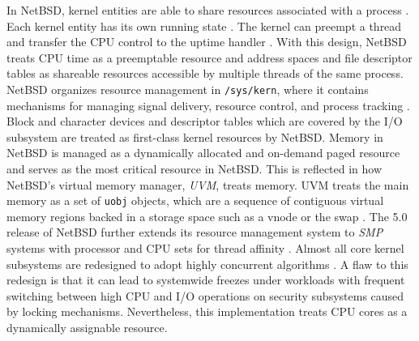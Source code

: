 In NetBSD, kernel entities are able to share resources associated with a process \parencite{williams_scheduler}.
Each kernel entity has its own running state \parencite{williams_scheduler}. The kernel can preempt a thread and transfer
the CPU control to the uptime handler \parencite{williams_scheduler}. With this design, NetBSD treats CPU time as a
preemptable resource and address spaces and file descriptor tables as shareable resources accessible by multiple threads
of the same process. NetBSD organizes resource management in \texttt{/sys/kern}, where it contains mechanisms for
managing signal delivery, resource control, and process tracking \parencite{netbsd_src}. Block and character devices and
descriptor tables which are covered by the I/O subsystem are treated as first-class kernel resources by NetBSD.
Memory in NetBSD is managed as a dynamically allocated and on-demand paged resource and serves as the most critical resource
in NetBSD. This is reflected in how NetBSD's virtual memory manager, \textit{UVM}, treats memory. UVM treats the main
memory as a set of \texttt{uobj} objects, which are a sequence of contiguous virtual memory regions backed in a storage space
such as a vnode or the swap \parencite{netbsd_internals}. The 5.0 release of NetBSD further extends its resource
management system to \textit{SMP} systems with processor and CPU sets for thread affinity \parencite{netbsd_5_0}.
Almost all core kernel subsystems are redesigned to adopt highly concurrent algorithms \parencite{netbsd_5_0}.
A flaw to this redesign is that it can lead to systemwide freezes under workloads with frequent switching between high CPU
and I/O operations on security subsystems caused by locking mechanisms. Nevertheless, this implementation treats
CPU cores as a dynamically assignable resource.


